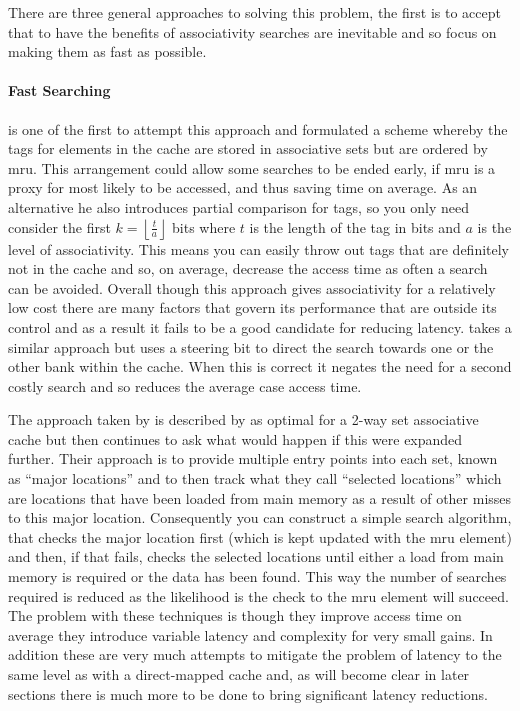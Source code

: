 There are three general approaches to solving this problem, the first is to accept that to have the benefits of associativity searches are inevitable and so focus on making them as fast as possible.

\paragraph{Fast Searching}

\citet{kesslerInexpensiveImplementationsSetAssociativity1989} is one of the first to attempt this approach and formulated a scheme whereby the tags for elements in the cache are stored in associative sets but are ordered by \gls{mru}. This arrangement could allow some searches to be ended early, if \gls{mru} is a proxy for most likely to be accessed, and thus saving time on average. As an alternative he also introduces partial comparison for tags, so you only need consider the first $k = \left\lfloor\frac{t}{a}\right\rfloor$ bits where $t$ is the length of the tag in bits and $a$ is the level of associativity. This means you can easily throw out tags that are definitely not in the cache and so, on average, decrease the access time as often a search can be avoided. Overall though this approach gives associativity for a relatively low cost there are many factors that govern its performance that are outside its control and as a result it fails to be a good candidate for reducing latency. \citet{calderPredictiveSequentialAssociative1996} takes a similar approach but uses a steering bit to direct the search towards one or the other bank within the cache. When this is correct it negates the need for a second costly search and so reduces the average case access time. 

The approach taken by \citeauthor{calderPredictiveSequentialAssociative1996} is described by 
\citet{chenxizhangMulticolumnImplementationsCache1997} as optimal for a 2-way set associative cache but then continues to ask what would happen if this were expanded further. Their approach is to provide multiple entry points into each set, known as ``major locations'' and to then track what they call ``selected locations'' which are locations that have been loaded from main memory as a result of other misses to this major location. Consequently you can construct a simple search algorithm, that checks the major location first (which is kept updated with the \gls{mru} element) and then, if that fails, checks the selected locations until either a load from main memory is required or the data has been found. This way the number of searches required is reduced as the likelihood is the check to the \gls{mru} element will succeed. The problem with these techniques is though they improve access time on average they introduce variable latency and complexity for very small gains. In addition these are very much attempts to mitigate the problem of latency to the same level as with a direct-mapped cache and, as will become clear in later sections there is much more to be done to bring significant latency reductions.

